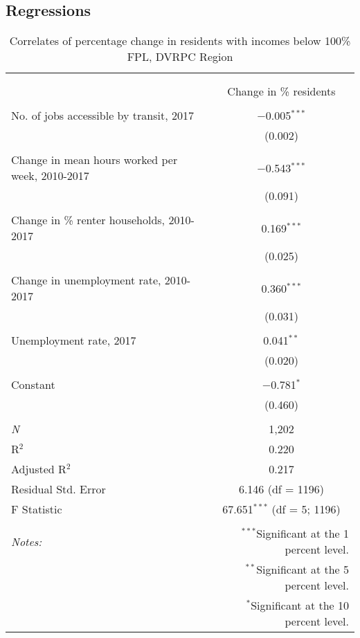 \documentclass[paper=letterpaper, fontsize=11pt]{scrartcl}
\begin{document}
\subsection{Regressions}
\begin{table}[!htbp] \centering 
	\caption{Correlates of percentage change in residents with incomes below 100\% FPL, DVRPC Region} 
	\label{} 
	\begin{tabular}{@{\extracolsep{5pt}}lc} 
		\\[-1.8ex]\hline 
		\hline \\[-1.8ex] 
		\\[-1.8ex] & Change in \% residents \\ 
		\hline \\[-1.8ex] 
		No. of jobs accessible by transit, 2017 & $-$0.005$^{***}$ \\ 
		& (0.002) \\ 
		& \\ 
		Change in mean hours worked per week, 2010-2017 & $-$0.543$^{***}$ \\ 
		& (0.091) \\ 
		& \\ 
		Change in \% renter households, 2010-2017 & 0.169$^{***}$ \\ 
		& (0.025) \\ 
		& \\ 
		Change in unemployment rate, 2010-2017 & 0.360$^{***}$ \\ 
		& (0.031) \\ 
		& \\ 
		Unemployment rate, 2017 & 0.041$^{**}$ \\ 
		& (0.020) \\ 
		& \\ 
		Constant & $-$0.781$^{*}$ \\ 
		& (0.460) \\ 
		& \\ 
		\textit{N} & 1,202 \\ 
		R$^{2}$ & 0.220 \\ 
		Adjusted R$^{2}$ & 0.217 \\ 
		Residual Std. Error & 6.146 (df = 1196) \\ 
		F Statistic & 67.651$^{***}$ (df = 5; 1196) \\ 
		\hline 
		\hline \\[-1.8ex] 
		\textit{Notes:} & \multicolumn{1}{r}{$^{***}$Significant at the 1 percent level.} \\ 
		& \multicolumn{1}{r}{$^{**}$Significant at the 5 percent level.} \\ 
		& \multicolumn{1}{r}{$^{*}$Significant at the 10 percent level.} \\ 
	\end{tabular} 
\end{table}
\end{document}
